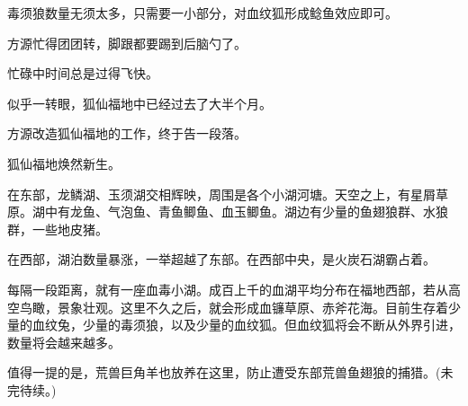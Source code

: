 \begin{this_body}
毒须狼数量无须太多，只需要一小部分，对血纹狐形成鲶鱼效应即可。

方源忙得团团转，脚跟都要踢到后脑勺了。

忙碌中时间总是过得飞快。

似乎一转眼，狐仙福地中已经过去了大半个月。

方源改造狐仙福地的工作，终于告一段落。

狐仙福地焕然新生。

在东部，龙鳞湖、玉须湖交相辉映，周围是各个小湖河塘。天空之上，有星屑草原。湖中有龙鱼、气泡鱼、青鱼鲫鱼、血玉鲫鱼。湖边有少量的鱼翅狼群、水狼群，一些地皮猪。

在西部，湖泊数量暴涨，一举超越了东部。在西部中央，是火炭石湖霸占着。

每隔一段距离，就有一座血毒小湖。成百上千的血湖平均分布在福地西部，若从高空鸟瞰，景象壮观。这里不久之后，就会形成血镰草原、赤斧花海。目前生存着少量的血纹兔，少量的毒须狼，以及少量的血纹狐。但血纹狐将会不断从外界引进，数量将会越来越多。

值得一提的是，荒兽巨角羊也放养在这里，防止遭受东部荒兽鱼翅狼的捕猎。(未完待续。)

\end{this_body}

